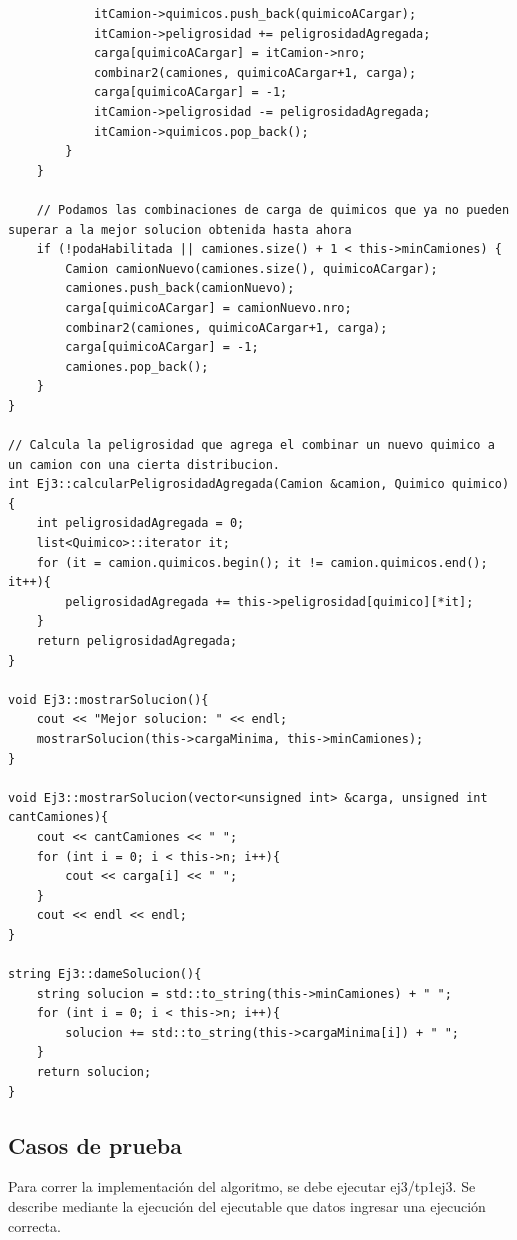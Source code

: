 \begin{lstlisting}
			itCamion->quimicos.push_back(quimicoACargar);
			itCamion->peligrosidad += peligrosidadAgregada;
			carga[quimicoACargar] = itCamion->nro;
			combinar2(camiones, quimicoACargar+1, carga);
			carga[quimicoACargar] = -1;
			itCamion->peligrosidad -= peligrosidadAgregada;
			itCamion->quimicos.pop_back();
		}
	}
	
	// Podamos las combinaciones de carga de quimicos que ya no pueden superar a la mejor solucion obtenida hasta ahora
	if (!podaHabilitada || camiones.size() + 1 < this->minCamiones) {
		Camion camionNuevo(camiones.size(), quimicoACargar);
		camiones.push_back(camionNuevo);
		carga[quimicoACargar] = camionNuevo.nro;
		combinar2(camiones, quimicoACargar+1, carga);
		carga[quimicoACargar] = -1;
		camiones.pop_back();
	}
}

// Calcula la peligrosidad que agrega el combinar un nuevo quimico a un camion con una cierta distribucion.
int Ej3::calcularPeligrosidadAgregada(Camion &camion, Quimico quimico){
	int peligrosidadAgregada = 0;
	list<Quimico>::iterator it;
	for (it = camion.quimicos.begin(); it != camion.quimicos.end(); it++){
		peligrosidadAgregada += this->peligrosidad[quimico][*it];
	}
	return peligrosidadAgregada;
}

void Ej3::mostrarSolucion(){
	cout << "Mejor solucion: " << endl;
	mostrarSolucion(this->cargaMinima, this->minCamiones);
}

void Ej3::mostrarSolucion(vector<unsigned int> &carga, unsigned int cantCamiones){
	cout << cantCamiones << " ";
	for (int i = 0; i < this->n; i++){
		cout << carga[i] << " ";
	}
	cout << endl << endl;
}

string Ej3::dameSolucion(){
	string solucion = std::to_string(this->minCamiones) + " ";
	for (int i = 0; i < this->n; i++){
		solucion += std::to_string(this->cargaMinima[i]) + " ";
	}
	return solucion;
}

\end{lstlisting}

\subsection{Casos de prueba}

\noindent 
Para correr la implementaci\'on del algoritmo, se debe ejecutar ej3/tp1ej3. Se describe mediante la ejecuci\'on del ejecutable que datos ingresar una ejecuci\'on correcta. \\

